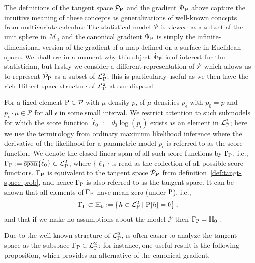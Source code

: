 \documentclass[a4,danish]{article}
\begin{document}
The definitions of the tangent space $\dot{\mathcal{P}}_{\P}$ and the gradient $\dot{\TT}_{\P}$
above capture the intuitive meaning of these concepts as generalizations of well-known concepts from
multivariate calculus: The statistical model $\mathcal{P}$ is viewed as a subset of the unit sphere
in $\mathcal{M}_{\mu}$ and the canonical gradient $\dot{\TT}_{\P}$ is simply the
infinite-dimensional version of the gradient of a map defined on a surface in Euclidean space. We
shall see in a moment why this object $\dot{\TT}_{\P}$ is of interest for the statistician, but
firstly we consider a different representation of $\mathcal{P}$ which allows us to represent
$\dot{\mathcal{P}}_{\P}$ as a subset of $\lp$; this is particularly useful as we then
have the rich Hilbert space structure of $\lp$ at our disposal.

For a fixed element $\P \in \mathcal{P}$ with $\mu$-density $p$,  of $\mu$-densities $p_{\epsilon}$ with
$p_0=p$ and $p_{\epsilon} \cdot \mu \in \mathcal{P}$ for all $\epsilon$ in some small interval. We
restrict attention to such submodels for which the score function
$\dot{\ell}_0 := \partial_0{\log(p_{\epsilon})}$ exists as an element in $\lp$; here we use the
terminology from ordinary maximum likelihood inference where the derivative of the likelihood for a
parametric model $p_{\epsilon}$ is referred to as the score function. We denote the closed linear
span of all such score functions by $\Gamma_{\P}$, i.e.,
$\Gamma_{\P} := \overline{\mathrm{span}}\{\dot{\ell}_0\} \subset \lp$, where $\{\dot{\ell}_0\}$ is
read as the collection of all possible score functions. 
$\Gamma_{\P}$ is equivalent to the tangent space $\dot{\mathcal{P}}_{\P}$ from
definition~\ref{def:tangt-space-prob}, and hence $\Gamma_{\P}$ is also referred to as the tangent
space. It can be shown that all elements of $\Gamma_{\P}$ have mean zero (under $\P$), i.e.,
\begin{equation*}
  \Gamma_{\P} \subset \mathbb{H}_0 := 
  \left\{
    h \in \lp \mid \P[h] = 0
  \right\}, 
\end{equation*}
and that if we make no assumptions about the model $\mathcal{P}$ then $\Gamma_{\P} = \mathbb{H}_0$
.

Due to the well-known structure of $\lp$, is often easier to analyze the tangent space as the
subspace $\Gamma_{\P} \subset \lp$; for instance, one useful result is the following proposition,
which provides an alternative  of the canonical gradient.
\end{document}
